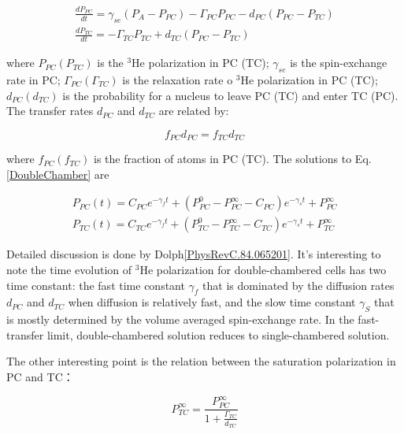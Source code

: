 \begin{subequations}\label{DoubleChamber}
	\begin{gather}
	\frac{dP_{PC}}{dt}=\gamma_{se}(P_{A}-P_{PC})-\Gamma_{PC}P_{PC}-d_{PC}(P_{PC}-P_{TC})\\
	\frac{dP_{TC}}{dt}=-\Gamma_{TC}P_{TC}+d_{TC}(P_{PC}-P_{TC})
	\end{gather}
\end{subequations}

where $P_{PC} (P_{TC})$ is the $^{3}$He polarization in PC (TC); $\gamma_{se}$ is the spin-exchange rate in PC; $\Gamma_{PC} (\Gamma_{TC})$  is the relaxation rate o $^{3}$He polarization in PC (TC); $d_{PC} (d_{TC})$ is the probability for a nucleus to leave PC (TC) and enter TC (PC). The transfer rates $d_{PC}$ and $d_{TC}$ are related by:

\begin{equation}
f_{PC}d_{PC}=f_{TC}d_{TC}
\end{equation}

where $f_{PC} (f_{TC})$ is the fraction of atoms in PC (TC). The solutions to Eq.\ref{DoubleChamber} are

\begin{subequations}\label{DoubleChamberSolution}
	\begin{gather}
	P_{PC}(t)=C_{PC}e^{-\gamma_{f}t}+(P_{PC}^{0}-P_{PC}^{\infty}-C_{PC})e^{-\gamma_{s}t}+P_{PC}^{\infty}\\
	P_{TC}(t)=C_{TC}e^{-\gamma_{f}t}+(P_{TC}^{0}-P_{TC}^{\infty}-C_{TC})e^{-\gamma_{s}t}+P_{TC}^{\infty}
	\end{gather}
\end{subequations}

Detailed discussion is done by Dolph\ref{PhysRevC.84.065201}. It's interesting to note the time evolution of $^{3}$He polarization for double-chambered cells has two time constant: the fast time constant $\gamma_{f}$ that is dominated by the diffusion rates $d_{PC}$ and $d_{TC}$ when diffusion is relatively fast, and the slow time constant $\gamma_{S}$ that is mostly determined by the volume averaged spin-exchange rate. In the fast-transfer limit, double-chambered solution reduces to single-chambered solution. 

The other interesting point is the relation between the saturation polarization in PC and TC：

\begin{equation}
P_{TC}^{\infty}=\frac{P_{PC}^{\infty}}{1+\frac{\Gamma_{TC}}{d_{TC}}}
\end{equation}

